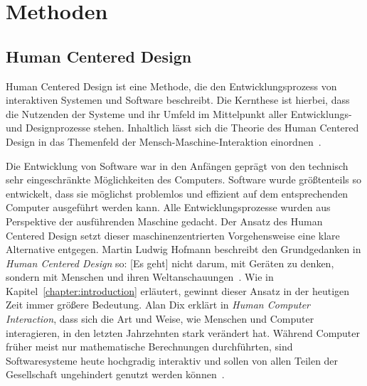 \chapter{Methoden}
\label{chapter:methods}

\section{Human Centered Design}
Human Centered Design ist eine Methode, die den Entwicklungsprozess von
interaktiven Systemen und Software beschreibt. Die Kernthese ist hierbei, dass
die Nutzenden der Systeme und ihr Umfeld im Mittelpunkt aller Entwicklungs\hyphen\space und
Designprozesse stehen. Inhaltlich lässt sich die Theorie des Human Centered
Design in das Themenfeld der Mensch-Maschine-Interaktion
einordnen~\cite{HMI-HCD}.

Die Entwicklung von Software war in den Anfängen geprägt von den technisch sehr
eingeschränkte Möglichkeiten des Computers. Software wurde größtenteils so
entwickelt, dass sie möglichst problemlos und effizient auf dem entsprechenden
Computer ausgeführt werden kann. Alle Entwicklungsprozesse wurden aus
Perspektive der ausführenden Maschine gedacht. Der Ansatz des Human Centered
Design setzt dieser maschinenzentrierten Vorgehensweise eine klare Alternative
entgegen. Martin Ludwig Hofmann beschreibt den Grundgedanken in \textit{Human
    Centered Design} so: \glqq{}[Es geht] nicht darum, mit Geräten zu denken,
sondern mit Menschen und ihren Weltanschauungen\grqq{}~\cite{hcd}. Wie in
Kapitel~\ref{chapter:introduction} erläutert, gewinnt dieser Ansatz in der
heutigen Zeit immer größere Bedeutung. Alan Dix erklärt in \textit{Human Computer
    Interaction}, dass sich die Art und Weise, wie Menschen und Computer
interagieren, in den letzten Jahrzehnten stark verändert hat. Während Computer
früher meist nur mathematische Berechnungen durchführten, sind Softwaresysteme
heute hochgradig interaktiv und sollen von allen Teilen der Gesellschaft
ungehindert genutzt werden können~\cite{hci}.

